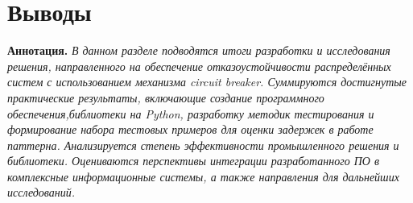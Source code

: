 


\section{Выводы}
\textbf{Аннотация. } \textit{В данном разделе подводятся итоги разработки и исследования решения, направленного на обеспечение отказоустойчивости распределённых систем с использованием механизма circuit breaker. Суммируются достигнутые практические результаты, включающие создание программного обеспечения,библиотеки на Python, разработку методик тестирования и формирование набора тестовых примеров для оценки задержек в работе паттерна. Анализируется степень эффективности промышленного решения и библиотеки. Оцениваются перспективы интеграции разработанного ПО в комплексные информационные системы, а также направления для дальнейших исследований.}


